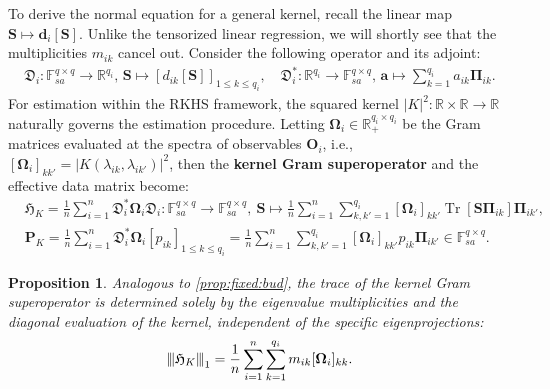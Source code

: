 \documentclass[noinfoline]{imsart}\setcounter{tocdepth}{2}
\renewcommand{\b}[1]{\mathbb{#1}} %
\newcommand{\m}[1]{\mathbf{#1}} %
\newcommand{\f}[1]{\mathfrak{#1}} %
\newcommand{\mb}[1]{\boldsymbol{#1}} %
\newcommand{\tr}[1]{\operatorname{Tr}\left[#1\right]}
\newcommand{\vertiii}[1]{{\left\vert\kern-0.25ex\left\vert\kern-0.25ex\left\vert #1 
    \right\vert\kern-0.25ex\right\vert\kern-0.25ex\right\vert}} %
\theoremstyle{plain}
\newtheorem{proposition}[theorem]{Proposition}
\begin{document}
To derive the normal equation for a general kernel, recall the linear map $\m{S} \mapsto \m{d}_{i}[\m{S}]$. Unlike the tensorized linear regression, we will shortly see that the multiplicities $m_{ik}$ cancel out. Consider the following operator and its adjoint: 
\begin{align*}
    \f{D}_{i}: \b{F}_{sa}^{q \times q} \to \b{R}^{q_{i}}, \, \m{S} \mapsto 
    \left[d_{ik}[\m{S}]  \right]_{1 \le k \le q_{i}}, \quad
    \f{D}_{i}^{*}: \b{R}^{q_{i}} \to \b{F}_{sa}^{q \times q}, \, \m{a} \mapsto \sum_{k=1}^{q_{i}} a_{ik} \m{\Pi}_{ik}.
\end{align*}
For estimation within the RKHS framework, the squared kernel $|K|^2 : \b{R} \times \b{R} \to \b{R}$ naturally governs the estimation procedure. Letting $\mb{\Omega}_{i} \in \b{R}_{+}^{q_{i} \times q_{i}}$ be the Gram matrices evaluated at the spectra of observables $\m{O}_{i}$, i.e., $[\mb{\Omega}_{i}]_{kk'} = |K(\lambda_{ik}, \lambda_{ik'})|^{2}$, then the \textbf{kernel Gram superoperator} and the effective data matrix become:
\begin{align*}
    &\f{H}_{K} = \frac{1}{n} \sum_{i=1}^{n} \f{D}_{i}^* \mb{\Omega}_{i} \f{D}_{i} : \b{F}_{sa}^{q \times q} \to \b{F}_{sa}^{q \times q}, \ \m{S} \mapsto \frac{1}{n} \sum_{i=1}^{n} \sum_{k, k'=1}^{q_{i}} [\mb{\Omega}_i]_{kk'} \tr{\m{S} \m{\Pi}_{ik}} \m{\Pi}_{ik'}, \\ 
    &\m{P}_{K} = \frac{1}{n} \sum_{i=1}^{n} \f{D}_{i}^* \mb{\Omega}_{i} \left[p_{i k} \right]_{1 \le k \le q_{i}} = \frac{1}{n} \sum_{i=1}^{n} \sum_{k, k'=1}^{q_{i}} [\mb{\Omega}_i]_{kk'} p_{ik} \m{\Pi}_{ik'} \in \b{F}_{sa}^{q \times q}.
\end{align*}

\begin{proposition}\label{prop:superoperator_trace_norm}
Analogous to \cref{prop:fixed:bud}, the trace of the kernel Gram superoperator is determined solely by the eigenvalue multiplicities and the diagonal evaluation of the kernel, independent of the specific eigenprojections:
\begin{align*}
    \vertiii{\f{H}_{K}}_{1} = \frac{1}{n} \sum_{i=1}^{n} \sum_{k=1}^{q_{i}} m_{ik} [\mb{\Omega}_i]_{kk} .
\end{align*}
\end{proposition}
\end{document}

